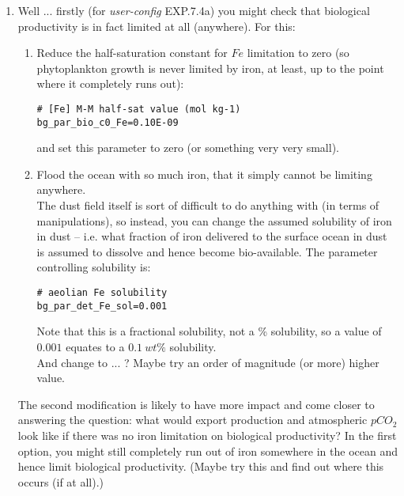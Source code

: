 \documentclass[11pt,fleqn]{book} %
\begin{document}
\begin{enumerate}[noitemsep]

\vspace{1mm}
\item Well ... firstly (for \textit{user-config} \textsf{\footnotesize EXP.7.4a}) you might check that biological productivity is in fact limited at all (anywhere). For this:
\begin{enumerate}[noitemsep]
\vspace{1mm}
\item Reduce the half-saturation constant for \(Fe\) limitation to zero (so phytoplankton growth is never limited by iron, at least, up to the point where it completely runs out):
\vspace{-1mm}\small\begin{verbatim}
# [Fe] M-M half-sat value (mol kg-1)
bg_par_bio_c0_Fe=0.10E-09
\end{verbatim}\normalsize\vspace{-1mm}
and set this parameter to zero (or something very very small).
\vspace{1mm}
\item Flood the ocean with so much iron, that it simply cannot be limiting anywhere.
\\The dust field itself is sort of difficult to do anything with (in terms of manipulations), so instead, you can change the assumed solubility of iron in dust -- i.e. what fraction of iron delivered to the surface ocean in dust is assumed to dissolve and hence become bio-available. The parameter controlling solubility is:
\vspace{-1mm}\small\begin{verbatim}
# aeolian Fe solubility
bg_par_det_Fe_sol=0.001
\end{verbatim}\normalsize\vspace{-1mm}
Note that this is a fractional solubility, not a \% solubility, so a value of \(0.001\) equates to a \(0.1\:wt\%\) solubility.
\\And change to ... ? Maybe try an order of magnitude (or more) higher value.
\end{enumerate}
\vspace{1mm}
The second modification is likely to have more impact and come closer to answering the question: what would export production and atmospheric \(pCO_{2}\) look like if there was no iron limitation on biological productivity? In the first option, you might still completely run out of iron somewhere in the ocean and hence limit biological productivity. (Maybe try this and find out where this occurs (if at all).)


\end{enumerate}
\end{document}

